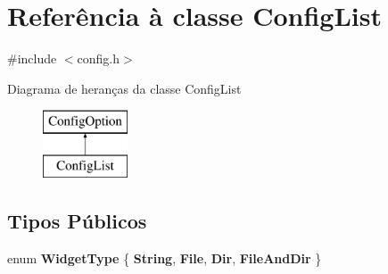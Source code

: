 \hypertarget{class_config_list}{\section{Referência à classe Config\-List}
\label{class_config_list}
}


{\ttfamily \#include $<$config.\-h$>$}

Diagrama de heranças da classe Config\-List\begin{figure}[H]
\begin{center}
\leavevmode
\includegraphics[height=2.000000cm]{class_config_list}
\end{center}
\end{figure}
\subsection*{Tipos Públicos}
\begin{DoxyCompactItemize}
\item 
enum {\bfseries Widget\-Type} \{ {\bfseries String}, 
{\bfseries File}, 
{\bfseries Dir}, 
{\bfseries File\-And\-Dir}
 \}
\end{DoxyCompactItemize}
